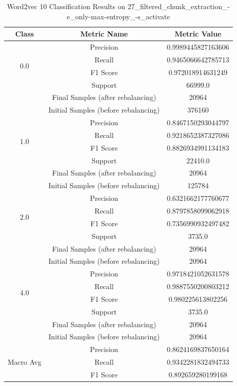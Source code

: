 \begin{longtable}{|c|c|c|}
\caption{Word2vec 10 Classification Results on 27\_filtered\_chunk\_extraction\_-e\_only-max-entropy\_-s\_activate} \label{tab:27_filtered_chunk_extraction_-e_only-max-entropy_-s_activate_word2vec_10_classifiers_results} \\
\hline
Class & Metric Name & Metric Value \\
\hline
\multirow{4}{*}{0.0} & Precision & 0.9989445827163606 \\
 & Recall & 0.9465066642785713 \\
 & F1 Score & 0.972018914631249 \\
 & Support & 66999.0 \\
 & Final Samples (after rebalancing) & 20964 \\
 & Initial Samples (before rebalancing) & 376160 \\
\hline
\multirow{4}{*}{1.0} & Precision & 0.8467150293044797 \\
 & Recall & 0.9218652387327086 \\
 & F1 Score & 0.8826934991134183 \\
 & Support & 22410.0 \\
 & Final Samples (after rebalancing) & 20964 \\
 & Initial Samples (before rebalancing) & 125784 \\
\hline
\multirow{4}{*}{2.0} & Precision & 0.6321662177760677 \\
 & Recall & 0.8797858099062918 \\
 & F1 Score & 0.7356990932497482 \\
 & Support & 3735.0 \\
 & Final Samples (after rebalancing) & 20964 \\
 & Initial Samples (before rebalancing) & 20964 \\
\hline
\multirow{4}{*}{4.0} & Precision & 0.9718421052631578 \\
 & Recall & 0.9887550200803212 \\
 & F1 Score & 0.980225613802256 \\
 & Support & 3735.0 \\
 & Final Samples (after rebalancing) & 20964 \\
 & Initial Samples (before rebalancing) & 20964 \\
\hline
\multirow{4}{*}{Macro Avg} & Precision & 0.8624169837650164 \\
 & Recall & 0.9342281832494733 \\
 & F1 Score & 0.892659280199168 \\

\end{longtable}
